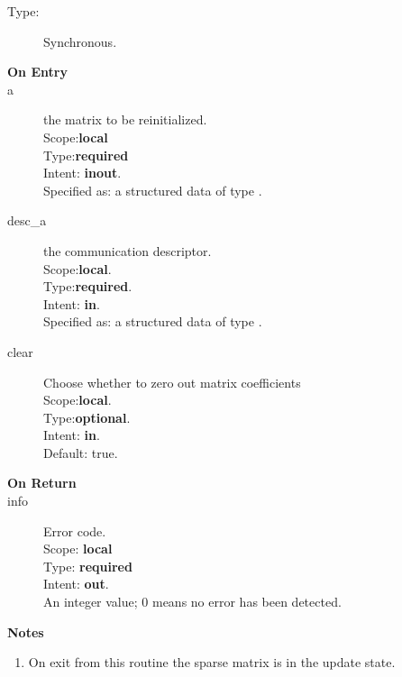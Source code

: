 \begin{description}
\item[Type:] Synchronous.
\item[\bf On Entry]
\item[a] the matrix to be reinitialized.\\
Scope:{\bf local}\\
Type:{\bf required}\\
Intent: {\bf inout}.\\
Specified as: a structured data of type \spdata.
\item[desc\_a] the communication descriptor.\\
Scope:{\bf local}.\\
Type:{\bf required}.\\
Intent: {\bf in}.\\
Specified as: a structured data of type \descdata.
\item[clear] Choose whether to zero out matrix coefficients\\
Scope:{\bf local}.\\
Type:{\bf optional}.\\
Intent: {\bf in}.\\
Default: true.
\end{description}

\begin{description}
\item[\bf On Return]
\item[info] Error code.\\
Scope: {\bf local} \\
Type: {\bf required} \\
Intent: {\bf out}.\\
An integer value; 0 means no error has been detected. 
\end{description}
{\par\noindent\large\bfseries Notes}
\begin{enumerate}
\item On exit from this routine the sparse matrix is in the update
  state. 
\end{enumerate}
%
%




